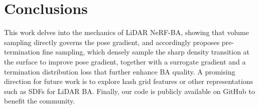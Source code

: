 \section{Conclusions}
This work delves into the mechanics of LiDAR NeRF-BA, showing that volume sampling directly governs the pose gradient, and accordingly proposes pre-termination fine sampling, which densely sample the sharp density transition at the surface to improve pose gradient, together with a surrogate gradient and a termination distribution loss that further enhance BA quality. A promising direction for future work is to explore hash grid features or other representations such as SDFs for LiDAR BA. Finally, our code is publicly available on GitHub to benefit the community.
